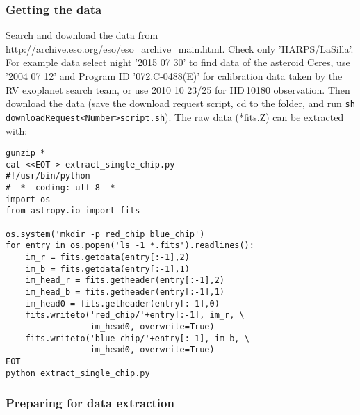 \documentclass[10pt,a4paper]{article}
\begin{document}
\subsubsection{Getting the data}
Search and download the data from \url{http://archive.eso.org/eso/eso_archive_main.html}. Check only 'HARPS/LaSilla'. For example data select night '2015 07 30' to find data of the asteroid Ceres, use '2004 07 12' and Program ID '072.C-0488(E)' for calibration data taken by the RV exoplanet search team, or use 2010 10 23/25 for HD\,10180 observation. Then download the data (save the download request script, cd to the folder, and run \verb|sh  downloadRequest<Number>script.sh|). The raw data (*fits.Z) can be extracted with:
\begin{lstlisting}[style=base]
gunzip *
cat <<EOT > extract_single_chip.py
#!/usr/bin/python
# -*- coding: utf-8 -*-
import os
from astropy.io import fits

os.system('mkdir -p red_chip blue_chip')
for entry in os.popen('ls -1 *.fits').readlines():
    im_r = fits.getdata(entry[:-1],2)
    im_b = fits.getdata(entry[:-1],1)
    im_head_r = fits.getheader(entry[:-1],2)
    im_head_b = fits.getheader(entry[:-1],1)
    im_head0 = fits.getheader(entry[:-1],0)
    fits.writeto('red_chip/'+entry[:-1], im_r, \
                 im_head0, overwrite=True)
    fits.writeto('blue_chip/'+entry[:-1], im_b, \
                 im_head0, overwrite=True)
EOT
python extract_single_chip.py
\end{lstlisting}


\subsubsection{Preparing for data extraction}
\end{document}
